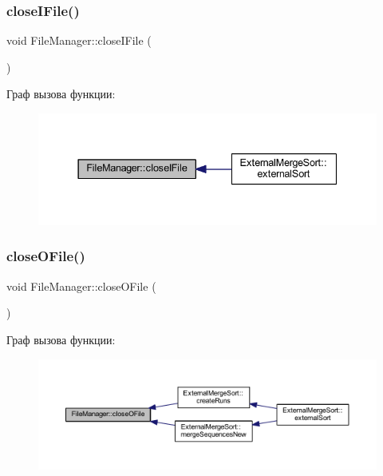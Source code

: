 \subsubsection{\texorpdfstring{close\+I\+File()}{closeIFile()}}
{\footnotesize\ttfamily void File\+Manager\+::close\+I\+File (\begin{DoxyParamCaption}{ }\end{DoxyParamCaption})}

Граф вызова функции\+:\nopagebreak
\begin{figure}[H]
\begin{center}
\leavevmode
\includegraphics[width=337pt]{class_file_manager_a4a4719a410ca31985e8b75ad75485ce6_icgraph}
\end{center}
\end{figure}
\hypertarget{class_file_manager_a6a1f1ddbf047fc7e9531f483e4c62148}{}\label{class_file_manager_a6a1f1ddbf047fc7e9531f483e4c62148} 
\subsubsection{\texorpdfstring{close\+O\+File()}{closeOFile()}}
{\footnotesize\ttfamily void File\+Manager\+::close\+O\+File (\begin{DoxyParamCaption}{ }\end{DoxyParamCaption})}

Граф вызова функции\+:\nopagebreak
\begin{figure}[H]
\begin{center}
\leavevmode
\includegraphics[width=350pt]{class_file_manager_a6a1f1ddbf047fc7e9531f483e4c62148_icgraph}
\end{center}
\end{figure}
\hypertarget{class_file_manager_a654c8bf606626cd419f5828839cb21a1}{}\label{class_file_manager_a654c8bf606626cd419f5828839cb21a1} 
